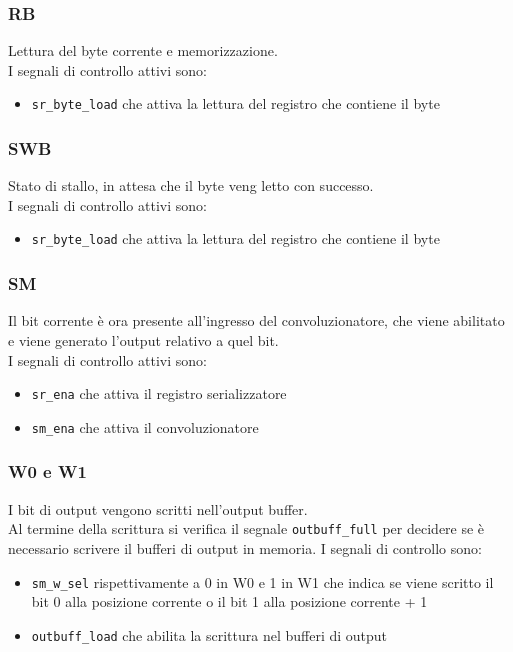 \documentclass[12pt, a4paper]{article}
\begin{document}
\subsubsection{RB}
Lettura del byte corrente e memorizzazione.\\
I segnali di controllo attivi sono:
\begin{itemize}
    \item \texttt{sr\_byte\_load} che attiva la lettura del registro che contiene il byte
\end{itemize}

\subsubsection{SWB}
Stato di stallo, in attesa che il byte veng letto con successo.\\
I segnali di controllo attivi sono:
\begin{itemize}
    \item \texttt{sr\_byte\_load} che attiva la lettura del registro che contiene il byte
\end{itemize}

\subsubsection{SM}
Il bit corrente è ora presente all'ingresso del convoluzionatore, che viene abilitato e viene
generato l'output relativo a quel bit.\\
I segnali di controllo attivi sono:
\begin{itemize}
    \item \texttt{sr\_ena} che attiva il registro serializzatore
    \item \texttt{sm\_ena} che attiva il convoluzionatore
\end{itemize}

\subsubsection{W0 e W1}
I bit di output vengono scritti nell'output buffer.\\
Al termine della scrittura si verifica il segnale \texttt{outbuff\_full} per decidere
se è necessario scrivere il bufferi di output in memoria.
I segnali di controllo sono:
\begin{itemize}
    \item \texttt{sm\_w\_sel} rispettivamente a 0 in W0 e 1 in W1 che indica se viene 
                              scritto il bit 0 alla posizione corrente o il bit 1 alla posizione corrente + 1
    \item \texttt{outbuff\_load} che abilita la scrittura nel bufferi di output
\end{itemize}
\end{document}
